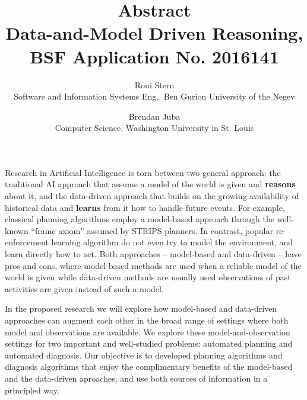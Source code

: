 \documentclass[12pt]{article}
\begin{document}
\title{Abstract \\ \Large{Data-and-Model Driven Reasoning, BSF Application No. 2016141}}
\date{\vspace{-0.5cm}}
\author{Roni Stern \\ Software and Information Systems Eng., Ben Gurion University of the Negev
        \and Brendan Juba \\ Computer Science, Washington University in St. Louis}
\maketitle

Research in Artificial Intelligence is torn between two general approach: the traditional AI approach that assume a model of the world is given and {\bf reasons} about it, and the data-driven  approach that builds on the growing availability of historical data and {\bf learns} from it how to handle future events. For example, classical planning algorithms 
employ a model-based approach through the well-known ``frame axiom'' assumed by STRIPS planners. In contrast, popular re-enforcement learning algorithm do not even try to model the environment, and learn directly how to act. Both approaches -- model-based and data-driven -- have pros and cons, where model-based methods are used when a reliable model of the world is given while 
data-driven methods are usually used observations of past activities are given instead of such a model. %





In the proposed research we will explore how model-based and data-driven approaches can augment each other in the broad range of settings where both model and observations are available. We explore these model-and-observation settings for two important and well-studied problems: automated planning and automated diagnosis. 
Our objective is to developed planning algorithms and diagnosis algorithms that enjoy the complimentary benefits of the model-based and the data-driven aproaches, and use both sources of information in a principled way. 
\end{document}
